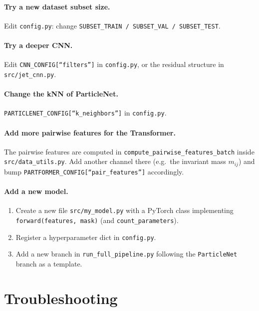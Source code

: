 \documentclass[11pt,a4paper]{article}
\begin{document}
\paragraph{Try a new dataset subset size.}
Edit \texttt{config.py}: change \texttt{SUBSET\_TRAIN /
SUBSET\_VAL / SUBSET\_TEST}.

\paragraph{Try a deeper CNN.}
Edit \texttt{CNN\_CONFIG[``filters'']} in \texttt{config.py}, or
the residual structure in \texttt{src/jet\_cnn.py}.

\paragraph{Change the kNN of ParticleNet.}
\texttt{PARTICLENET\_CONFIG[``k\_neighbors'']} in \texttt{config.py}.

\paragraph{Add more pairwise features for the Transformer.}
The pairwise features are computed in
\texttt{compute\_pairwise\_features\_batch} inside
\texttt{src/data\_utils.py}. Add another channel there (e.g.\ the
invariant mass $m_{ij}$) and bump
\texttt{PARTFORMER\_CONFIG[``pair\_features'']} accordingly.

\paragraph{Add a new model.}
\begin{enumerate}
    \item Create a new file \texttt{src/my\_model.py} with a
          PyTorch class implementing \texttt{forward(features,
          mask)} (and \texttt{count\_parameters}).
    \item Register a hyperparameter dict in \texttt{config.py}.
    \item Add a new branch in \texttt{run\_full\_pipeline.py}
          following the \texttt{ParticleNet} branch as a template.
\end{enumerate}

\section{Troubleshooting}\label{sec:trouble}
\end{document}
